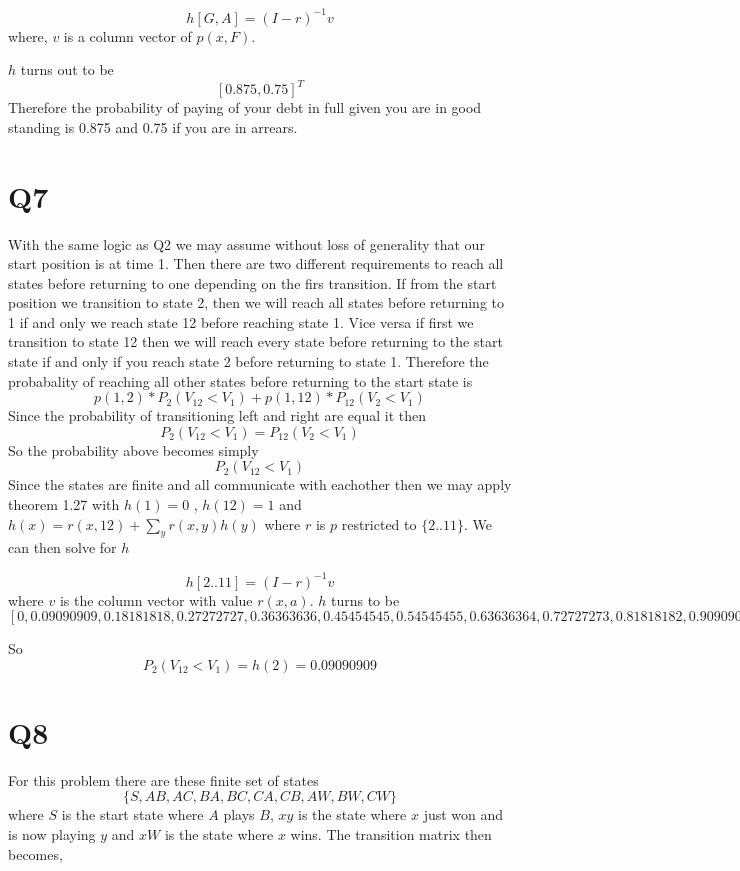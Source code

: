\documentclass{article}
\begin{document}
\[
h[G,A] = (I - r)^{-1}v
\]
where, $v$ is a column vector of $p(x,F)$.

$h$ turns out to be
\[
[ 0.875,  0.75 ]^T
\]
Therefore the probability of paying of your debt in full given you are in good standing is 0.875 and 0.75 if you are in arrears. 

\section*{Q7}
With the same logic as Q2 we may assume without loss of generality that our start position is at time 1. Then there are two different requirements to reach all states before returning to one depending on the firs transition. If from the start position we transition to state 2, then we will reach all states before returning to 1 if and only we reach state 12 before reaching state 1. Vice versa if first we transition to state 12 then we will reach every state before returning to the start state if and only if you reach state 2 before returning to state 1. 
Therefore the probabality of reaching all other states before returning to the start state is
\[
p(1,2)*P_2(V_12 < V_1) + p(1,12)*P_12(V_2 < V_1)
\]
Since the probability of transitioning left and right are equal it then 
\[
P_2(V_{12} < V_1) = P_12(V_2 < V_1)
\]
So the probability above becomes simply
\[
P_2(V_{12} < V_1)
\]
Since the states are finite and all communicate with eachother then we may apply theorem 1.27 with $h(1) = 0$ , $h(12) = 1$ and $h(x) = r(x,12) + \sum_y r(x,y)h(y)$ where $r$ is $p$ restricted to $\{2..11\}$. 
We can then solve for $h$

\[
h[2 .. 11] = (I -r)^{-1} v
\]
where $v$ is the column vector with value $r(x,a)$.
$h$ turns to be 
\[
[0, 0.09090909,  0.18181818,  0.27272727,  0.36363636,  0.45454545,
        0.54545455,  0.63636364,  0.72727273,  0.81818182,  0.90909091,1]
\]

So
\[
P_2(V_{12} < V_1) = h(2) = 0.09090909
\]

\section*{Q8}
For this problem there are these finite set of states
\[
\{S, AB, AC, BA, BC, CA, CB, AW, BW, CW\}
\]
where $S$ is the start state where $A$ plays $B$, $xy$ is the state where $x$ just won and is now playing $y$ and $xW$ is the state where $x$ wins. 
The transition matrix then becomes,
\end{document}
